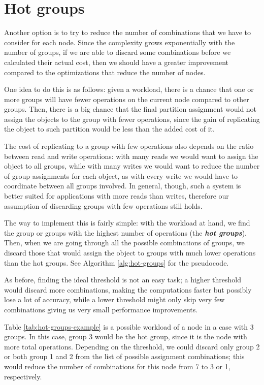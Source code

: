 \section{Hot groups}\label{sec:hot-groups}
Another option is to try to reduce the number of combinations that we have to consider for each node. Since the complexity grows exponentially with the number of groups, if we are able to discard some combinations before we calculated their actual cost, then we should have a greater improvement compared to the optimizations that reduce the number of nodes.

One idea to do this is as follows: given a workload, there is a chance that one or more groups will have fewer operations on the current node compared to other groups. Then, there is a big chance that the final partition assignment would not assign the objects to the group with fewer operations, since the gain of replicating the object to such partition would be less than the added cost of it.

The cost of replicating to a group with few operations also depends on the ratio between read and write operations: with many reads we would want to assign the object to all groups, while with many writes we would want to reduce the number of group assignments for each object, as with every write we would have to coordinate between all groups involved. In general, though, such a system is better suited for applications with more reads than writes, therefore our assumption of discarding groups with few operations still holds.

The way to implement this is fairly simple: with the workload at hand, we find the group or groups with the highest number of operations (the \textbf{\emph{hot groups}}). Then, when we are going through all the possible combinations of groups, we discard those that would assign the object to groups with much lower operations than the hot groups.  See Algorithm \ref{alg:hot-groups} for the pseudocode.

As before, finding the ideal threshold is not an easy task; a higher threshold would discard more combinations, making the computations faster but possibly lose a lot of accuracy, while a lower threshold might only skip very few combinations giving us very small performance improvements. 

Table \ref{tab:hot-groups-example} is a possible workload of a node in a case with 3 groups. In this case, group 3 would be the hot group, since it is the node with more total operations. Depending on the threshold, we could discard only group 2 or both group 1 and 2 from the list of possible assignment combinations; this would reduce the number of combinations for this node from 7 to 3 or 1, respectively.


